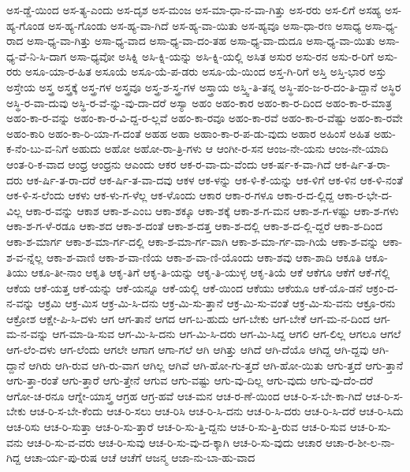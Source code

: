 {ಅಸ-ಡ್ಡೆ-ಯಿಂದ
ಅಸ-ತ್ಯ-ಎಂದು
ಅಸ-ದೃಶ
ಅಸ-ಮಂಜ
ಅಸ-ಮಾ-ಧಾ-ನ-ವಾ-ಗಿತ್ತು
ಅಸ-ರರು
ಅಸ-ಲಿಗೆ
ಅಸಹ್ಯ
ಅಸ-ಹ್ಯ-ಗೊಂಡ
ಅಸ-ಹ್ಯ-ಗೊಂಡು
ಅಸ-ಹ್ಯ-ವಾ-ಗಿದೆ
ಅಸ-ಹ್ಯ-ವಾ-ಯಿತು
ಅಸ-ಹ್ಯವೂ
ಅಸಾ-ಧಾ-ರಣ
ಅಸಾಧ್ಯ
ಅಸಾ-ಧ್ಯ-ರಾದ
ಅಸಾ-ಧ್ಯ-ವಾ-ಗಿತ್ತು
ಅಸಾ-ಧ್ಯ-ವಾದ
ಅಸಾ-ಧ್ಯ-ವಾ-ದಂ-ತಹ
ಅಸಾ-ಧ್ಯ-ವಾ-ದುದೂ
ಅಸಾ-ಧ್ಯ-ವಾ-ಯಿತು
ಅಸಾ-ಧ್ಯ-ವೆ-ನಿ-ಸಿ-ದಾಗ
ಅಸಾ-ಧ್ಯವೋ
ಅಸಿಕ್ನಿ
ಅಸಿ-ಕ್ನಿ-ಯನ್ನು
ಅಸಿ-ಕ್ನಿ-ಯಲ್ಲಿ
ಅಸಿತ
ಅಸುರ
ಅಸು-ರನ
ಅಸು-ರ-ರಿಗೆ
ಅಸು-ರರು
ಅಸೂ-ಯಾ-ರ-ಹಿತ
ಅಸೂಯೆ
ಅಸೂ-ಯೆ-ಪ-ಡರು
ಅಸೂ-ಯೆ-ಯಿಂದ
ಅಸ್ತ-ಗಿ-ರಿಗೆ
ಅಸ್ತಿ
ಅಸ್ತಿ-ಭಾರ
ಅಸ್ತು
ಅಸ್ತೇಯ
ಅಸ್ತ್ರ
ಅಸ್ತ್ರಕ್ಕೆ
ಅಸ್ತ್ರ-ಗಳ
ಅಸ್ತ್ರವೂ
ಅಸ್ತ್ರ-ಶ-ಸ್ತ್ರ-ಗಳ
ಅಸ್ತ್ರಾಯ
ಅಸ್ತ್ವಿ-ತಿ-ತನ್ನ
ಅಸ್ಥಿ-ಪಂ-ಜ-ರ-ದಂ-ತಿ-ದ್ದಾನೆ
ಅಸ್ಥಿರ
ಅಸ್ಥಿ-ರ-ವಾ-ದುವು
ಅಸ್ಥಿ-ರ-ವೆ-ನ್ನು-ವು-ದಾ-ದರೆ
ಅಸ್ಯಾ
ಅಹಂ
ಅಹಂ-ಕಾರ
ಅಹಂ-ಕಾ-ರ-ದಿಂದ
ಅಹಂ-ಕಾ-ರ-ಮಾತ್ರ
ಅಹಂ-ಕಾ-ರ-ವನ್ನು
ಅಹಂ-ಕಾ-ರ-ವಿ-ದ್ದ-ರ-ಲ್ಲವೆ
ಅಹಂ-ಕಾ-ರವೂ
ಅಹಂ-ಕಾ-ರವೆ
ಅಹಂ-ಕಾ-ರ-ವೆಷ್ಟು
ಅಹಂ-ಕಾ-ರವೇ
ಅಹಂ-ಕಾರಿ
ಅಹಂ-ಕಾ-ರಿ-ಯಾ-ಗ-ದಂತೆ
ಅಹಹ
ಅಹಾ
ಅಹಾಂ-ಕಾ-ರ-ಪ-ಡು-ವುದು
ಅಹಾರ
ಅಹಿಂಸೆ
ಅಹಿತ
ಅಹು-ಕ-ನೆಂ-ಬು-ವ-ನಿಗೆ
ಅಹುದು
ಅಹೋ
ಅಹೋ-ರಾ-ತ್ರಿ-ಗಳು
ಆ
ಆಂಗೀ-ರ-ಸನ
ಆಂಜ-ನೇ-ಯನು
ಆಂಜ-ನೇ-ಯಾದಿ
ಆಂತ-ರಿ-ಕ-ವಾದ
ಆಂಧ್ರ
ಆಂಧ್ರನು
ಆಎಂದು
ಆಕರ
ಆಕ-ರ-ವಾ-ದು-ವೆಂದು
ಆಕ-ರ್ಷ-ಕ-ವಾ-ಗಿದೆ
ಆಕ-ರ್ಷಿ-ತ-ರಾ-ದರು
ಆಕ-ರ್ಷಿ-ತ-ರಾ-ದರೆ
ಆಕ-ರ್ಷಿ-ತ-ವಾ-ದವು
ಆಕಳ
ಆಕ-ಳನ್ನು
ಆಕ-ಳಿ-ಕೆ-ಯನ್ನು
ಆಕ-ಳಿಗೆ
ಆಕ-ಳಿನ
ಆಕ-ಳಿ-ನಂತೆ
ಆಕ-ಳಿ-ಸ-ಲೆಂದು
ಆಕಳು
ಆಕ-ಳು-ಗ-ಳೆಲ್ಲ
ಆಕ-ಳೊಂದು
ಆಕಾರ
ಆಕಾ-ರ-ಗಳೂ
ಆಕಾ-ರ-ದ-ಲ್ಲಿದ್ದ
ಆಕಾ-ರ-ಭೇ-ದ-ವಿಲ್ಲ
ಆಕಾ-ರ-ವನ್ನು
ಆಕಾಶ
ಆಕಾ-ಶ-ಎಂಬ
ಆಕಾ-ಶಕ್ಕೂ
ಆಕಾ-ಶಕ್ಕೆ
ಆಕಾ-ಶ-ಗ-ಮನ
ಆಕಾ-ಶ-ಗ-ಳಷ್ಟು
ಆಕಾ-ಶ-ಗಳು
ಆಕಾ-ಶ-ಗ-ಳೆ-ರಡೂ
ಆಕಾ-ಶದ
ಆಕಾ-ಶ-ದಂತೆ
ಆಕಾ-ಶ-ದತ್ತ
ಆಕಾ-ಶ-ದಲ್ಲಿ
ಆಕಾ-ಶ-ದ-ಲ್ಲಿ-ದ್ದರೆ
ಆಕಾ-ಶ-ದಿಂದ
ಆಕಾ-ಶ-ಮಾರ್ಗ
ಆಕಾ-ಶ-ಮಾ-ರ್ಗ-ದಲ್ಲಿ
ಆಕಾ-ಶ-ಮಾ-ರ್ಗ-ವಾಗಿ
ಆಕಾ-ಶ-ಮಾ-ರ್ಗ-ವಾ-ಗಿಯೆ
ಆಕಾ-ಶ-ವನ್ನು
ಆಕಾ-ಶ-ವ-ನ್ನೆಲ್ಲ
ಆಕಾ-ಶ-ವಾಣಿ
ಆಕಾ-ಶ-ವಾ-ಣಿಯ
ಆಕಾ-ಶ-ವಾ-ಣಿ-ಯೊಂದು
ಆಕಾ-ಶವು
ಆಕಾ-ಶಾದಿ
ಆಕೂತಿ
ಆಕೂ-ತಿಯು
ಆಕೂ-ತೀ-ನಾಂ
ಆಕೃತಿ
ಆಕೃ-ತಿಗೆ
ಆಕೃ-ತಿ-ಯನ್ನು
ಆಕೃ-ತಿ-ಯುಳ್ಳ
ಆಕೃ-ತಿಯೆ
ಆಕೆ
ಆಕೆಗೂ
ಆಕೆಗೆ
ಆಕೆ-ಗೆಲ್ಲಿ
ಆಕೆಯ
ಆಕೆ-ಯತ್ತ
ಆಕೆ-ಯನ್ನು
ಆಕೆ-ಯನ್ನೂ
ಆಕೆ-ಯಲ್ಲಿ
ಆಕೆ-ಯಿಂದ
ಆಕೆಯು
ಆಕೆಯೂ
ಆಕೆ-ಯೊ-ಡನೆ
ಆಕ್ರಂ-ದ-ನ-ವನ್ನು
ಆಕ್ರಮಿ
ಆಕ್ರ-ಮಿಸ
ಆಕ್ರ-ಮಿ-ಸಿ-ದನು
ಆಕ್ರ-ಮಿ-ಸು-ತ್ತಾನೆ
ಆಕ್ರ-ಮಿ-ಸು-ವಂತೆ
ಆಕ್ರ-ಮಿ-ಸು-ವನು
ಆಕ್ರೂ-ರನು
ಆಕ್ರೋಶ
ಆಕ್ಷೇ-ಪಿ-ಸಿ-ದಳು
ಆಗ
ಆಗ-ತಾನೆ
ಆಗದ
ಆಗ-ಬ-ಹುದು
ಆಗ-ಬೇಕು
ಆಗ-ಬೇಕೆ
ಆಗ-ಮ-ನ-ದಿಂದ
ಆಗ-ಮ-ನ-ವನ್ನು
ಆಗ-ಮಾ-ಡಿ-ಸುವ
ಆಗ-ಮಿ-ಸಿ-ದನು
ಆಗ-ಮಿ-ಸಿ-ದರು
ಆಗ-ಮಿ-ಸಿದ್ದ
ಆಗಲಿ
ಆಗ-ಲಿಲ್ಲ
ಆಗಲೂ
ಆಗಲೆ
ಆಗ-ಲೆಂ-ದಳು
ಆಗ-ಲೆಂದು
ಆಗಲೇ
ಆಗಾಗ
ಆಗಾ-ಗಲೆ
ಆಗಿ
ಆಗಿತ್ತು
ಆಗಿದೆ
ಆಗಿ-ದೆಯೊ
ಆಗಿದ್ದ
ಆಗಿ-ದ್ದವು
ಆಗಿ-ದ್ದಾನೆ
ಆಗಿರು
ಆಗಿ-ರುವ
ಆಗಿ-ರು-ವಾಗ
ಆಗಿಲ್ಲ
ಆಗಿವೆ
ಆಗಿ-ಹೋ-ಗು-ತ್ತದೆ
ಆಗಿ-ಹೋ-ಯಿತು
ಆಗು-ತ್ತದೆ
ಆಗು-ತ್ತಾನೆ
ಆಗು-ತ್ತಾ-ರಂತೆ
ಆಗು-ತ್ತಾರೆ
ಆಗು-ತ್ತೇನೆ
ಆಗುವ
ಆಗು-ವಷ್ಟು
ಆಗು-ವು-ದಿಲ್ಲ
ಆಗು-ವುದು
ಆಗು-ವು-ದೆಂ-ದರೆ
ಆಗೋ-ಚ-ರನೂ
ಆಗ್ನೇ-ಯಾಸ್ತ್ರ
ಆಗ್ರಹ
ಆಗ್ರ-ಹವೆ
ಆಚ-ಮನ
ಆಚ-ರ-ಣೆ-ಯಿಂದ
ಆಚ-ರಿ-ಸ-ಬೇ-ಕಾ-ಗಿದೆ
ಆಚ-ರಿ-ಸ-ಬೇಕು
ಆಚ-ರಿ-ಸ-ಬೇ-ಕೆಂದು
ಆಚ-ರಿ-ಸಲು
ಆಚ-ರಿಸಿ
ಆಚ-ರಿ-ಸಿ-ದನು
ಆಚ-ರಿ-ಸಿ-ದರು
ಆಚ-ರಿ-ಸಿ-ದರೆ
ಆಚ-ರಿ-ಸಿದು
ಆಚ-ರಿಸು
ಆಚ-ರಿ-ಸುತ್ತಾ
ಆಚ-ರಿ-ಸು-ತ್ತಾರೆ
ಆಚ-ರಿ-ಸು-ತ್ತಿ-ದ್ದನು
ಆಚ-ರಿ-ಸು-ತ್ತಿ-ರುವ
ಆಚ-ರಿ-ಸುವ
ಆಚ-ರಿ-ಸು-ವನು
ಆಚ-ರಿ-ಸು-ವ-ವರು
ಆಚ-ರಿ-ಸುವು
ಆಚ-ರಿ-ಸು-ವು-ದ-ಕ್ಕಾಗಿ
ಆಚ-ರಿ-ಸು-ವುದು
ಆಚಾರ
ಆಚಾ-ರ-ಶೀ-ಲ-ನಾ-ಗಿದ್ದ
ಆಚಾ-ರ್ಯ-ಪು-ರುಷ
ಆಚೆ
ಆಚೆಗೆ
ಆಜನ್ಮ
ಆಜಾ-ನು-ಬಾ-ಹು-ವಾದ
}
